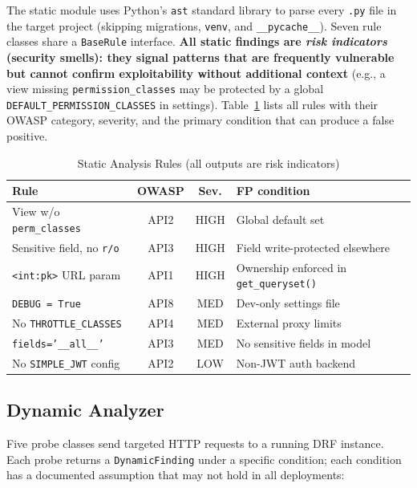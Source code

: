 \documentclass[conference]{IEEEtran}
\begin{document}
The static module uses Python's \texttt{ast} standard library to parse every
\texttt{.py} file in the target project (skipping migrations, \texttt{venv},
and \texttt{\_\_pycache\_\_}). Seven rule classes share a \texttt{BaseRule}
interface. \textbf{All static findings are \textit{risk indicators} (security
smells): they signal patterns that are frequently vulnerable but cannot
confirm exploitability without additional context} (e.g., a view missing
\texttt{permission\_classes} may be protected by a global
\texttt{DEFAULT\_PERMISSION\_CLASSES} in settings).
Table~\ref{tab:staticrules} lists all rules with their OWASP category,
severity, and the primary condition that can produce a false positive.

\begin{table}[htbp]
\caption{Static Analysis Rules (all outputs are risk indicators)}
\label{tab:staticrules}
\centering
\small
\setlength{\tabcolsep}{3pt}
\begin{tabular}{@{}p{2.6cm}ccp{1.8cm}@{}}
\toprule
\textbf{Rule} & \textbf{OWASP} & \textbf{Sev.} & \textbf{FP condition} \\
\midrule
View w/o \texttt{perm\_classes}    & API2 & HIGH & Global default set \\
Sensitive field, no \texttt{r/o}   & API3 & HIGH & Field write-protected elsewhere \\
\texttt{<int:pk>} URL param        & API1 & HIGH & Ownership enforced in \texttt{get\_queryset()} \\
\texttt{DEBUG = True}              & API8 & MED  & Dev-only settings file \\
No \texttt{THROTTLE\_CLASSES}      & API4 & MED  & External proxy limits \\
\texttt{fields='\_\_all\_\_'}      & API3 & MED  & No sensitive fields in model \\
No \texttt{SIMPLE\_JWT} config     & API2 & LOW  & Non-JWT auth backend \\
\bottomrule
\end{tabular}
\end{table}

\subsection{Dynamic Analyzer}

Five probe classes send targeted HTTP requests to a running DRF instance.
Each probe returns a \texttt{DynamicFinding} under a specific condition; each
condition has a documented assumption that may not hold in all deployments:
\end{document}
